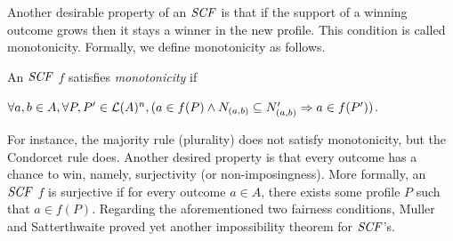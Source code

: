%
%
%
%

Another desirable property of an $\it{SCF}$ is that if the support of a winning
outcome grows then it stays a winner in the new profile.
This condition is called monotonicity. Formally, we define monotonicity as follows.

\begin{definition}
	An $\it{SCF}$ $f$ satisfies \textit{monotonicity} if 
	\begin{center}
		$\forall a,b \in A, \forall P,P' \in \mathcal{L}(A)^n, (a \in f(P) \wedge 
		N_{(a,b)} \subseteq N'_{(a,b)} \Rightarrow a \in f(P'))$.
	\end{center}
\end{definition}

For instance, the majority rule (plurality) does not satisfy monotonicity, but 
the Condorcet rule does.  Another desired property is that every outcome
has a chance to win, namely, surjectivity (or non-imposingness).  More formally, 
an $\it{SCF}$ $f$ is surjective if for every outcome $a \in A$, there exists
some profile $P$ such that $a \in f(P)$.
Regarding the aforementioned two fairness conditions, Muller and Satterthwaite \cite{Mull_Satt}
proved yet another impossibility theorem for $\it{SCF}$'s.

